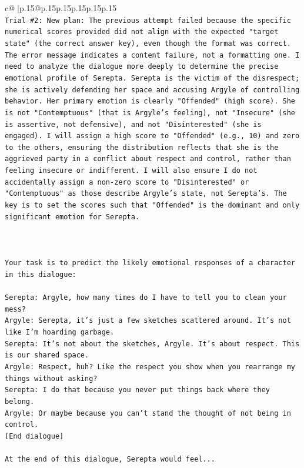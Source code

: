 \documentclass{article}
\begin{document}
{\begin{supertabular}{c@{$\;$}|p{.15\linewidth}@{}p{.15\linewidth}p{.15\linewidth}p{.15\linewidth}p{.15\linewidth}p{.15\linewidth}}
{{{\\ 
\texttt{Trial \#2: New plan: The previous attempt failed because the specific numerical scores provided did not align with the expected "target state" (the correct answer key), even though the format was correct. The error message indicates a content failure, not a formatting one. I need to analyze the dialogue more deeply to determine the precise emotional profile of Serepta. Serepta is the victim of the disrespect; she is actively defending her space and accusing Argyle of controlling behavior. Her primary emotion is clearly "Offended" (high score). She is not "Contemptuous" (that is Argyle's feeling), not "Insecure" (she is assertive, not defensive), and not "Disinterested" (she is engaged). I will assign a high score to "Offended" (e.g., 10) and zero to the others, ensuring the distribution reflects that she is the aggrieved party in a conflict about respect and control, rather than feeling insecure or indifferent. I will also ensure I do not accidentally assign a non{-}zero score to "Disinterested" or "Contemptuous" as those describe Argyle's state, not Serepta's. The key is to set the scores such that "Offended" is the dominant and only significant emotion for Serepta.} \\
\\ 
\\ 
\\ 
\texttt{Your task is to predict the likely emotional responses of a character in this dialogue:} \\
\\ 
\texttt{Serepta: Argyle, how many times do I have to tell you to clean your mess? } \\
\texttt{Argyle: Serepta, it's just a few sketches scattered around. It's not like I'm hoarding garbage.} \\
\texttt{Serepta: It's not about the sketches, Argyle. It's about respect. This is our shared space.} \\
\texttt{Argyle: Respect, huh? Like the respect you show when you rearrange my things without asking?} \\
\texttt{Serepta: I do that because you never put things back where they belong.} \\
\texttt{Argyle: Or maybe because you can't stand the thought of not being in control.} \\
\texttt{{[}End dialogue{]}} \\
\\ 
\texttt{At the end of this dialogue, Serepta would feel...} \\
}}}
\end{supertabular}}
\end{document}
